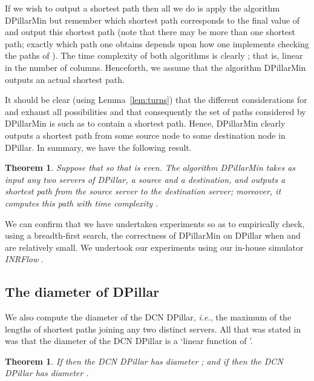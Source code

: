 \documentclass{article}
\newtheorem{theorem}[definition]{Theorem}
\begin{document}
If we wish to output a shortest path then all we do is apply the algorithm DPillarMin but remember which shortest path corresponds to the final value of  and output this shortest path (note that there may be more than one shortest path; exactly which path one obtains depends upon how one implements checking the paths of ). The time complexity of both algorithms is clearly ; that is, linear in the number of columns. Henceforth, we assume that the algorithm DPillarMin outputs an actual shortest path.

It should be clear (using Lemma~\ref{lem:turns}) that the different considerations for  and  exhaust all possibilities and that consequently the set of paths  considered by DPillarMin is such as to contain a shortest path. Hence, DPillarMin clearly outputs a shortest path from some source node to some destination node in DPillar. In summary, we have the following result.

\begin{theorem}
Suppose that  so that  is even. The algorithm DPillarMin takes as input any two servers of DPillar, a source and a destination, and outputs a shortest path from the source server to the destination server; moreover, it computes this path with time complexity .
\end{theorem}

We can confirm that we have undertaken experiments so as to empirically check, using a breadth-first search, the correctness of DPillarMin on DPillar when  and  are relatively small. We undertook our experiments using our in-house simulator \emph{INRFlow\/} \cite{INRFlow}.

\subsection{The diameter of DPillar}

We also compute the diameter of the DCN DPillar, \emph{i.e.}, the maximum of the lengths of shortest paths joining any two distinct servers. All that was stated in \cite{LYY12} was that the diameter of the DCN DPillar is a `linear function of '.

\begin{theorem}\label{thm:diam}
If  then the DCN DPillar has diameter ; and if  then the DCN DPillar has diameter .
\end{theorem}
\end{document}
